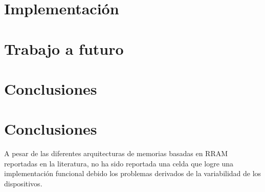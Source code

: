 \documentclass[reprint,amsmath,amssymb,aps]{revtex4-2}
\begin{document}
\section{Implementación}

\section{Trabajo a futuro}

\section{Conclusiones}




\section{Conclusiones}
A pesar de las diferentes arquitecturas de memorias basadas en RRAM reportadas en la literatura, no ha sido reportada una celda que logre una implementación funcional debido los problemas derivados de la variabilidad de los dispositivos.
  

\nocite{*}
\end{document}
